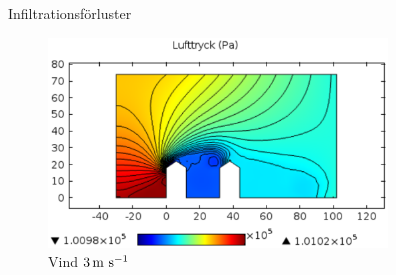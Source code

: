 \begin{frame}{Infiltrationsförluster}

\begin{figure}[hpbt]
\centering
\includegraphics[width=90mm]{images/pressure3ms.eps}
\caption{\label{fig:windpressure}Vind $\unit[3]{m~s^{-1}}$}
\end{figure}

\end{frame}
